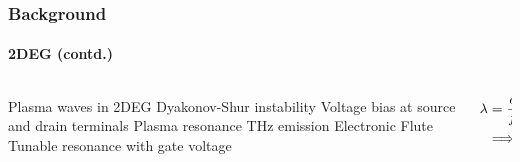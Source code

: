 \documentclass[mathserif,16pt,xcolor=table]{beamer}
\begin{document}
            \begin{frame}
              \frametitle{Background}
              \framesubtitle{2DEG (contd.)}

              \begin{columns} %
                \begin{column}{.5\textwidth}
                  \begin{minipage}[T][.1\textheight][c]{\linewidth}
                    \begin{outline}[itemize]
                      \1 Plasma waves in 2DEG
                      \1 Dyakonov-Shur instability
                        \2 Voltage bias at source and drain terminals
                        \2 Plasma resonance
                        \2 THz emission
                      \1 Electronic Flute
                        \2 Tunable resonance with gate voltage
                    \end{outline}
                  \end{minipage}
                \end{column}
                \begin{column}{.5\textwidth}
                  \begin{figure}
                    \hspace*{-.55cm}
                    \fontsize{6}{7}\selectfont
                    \def\svgwidth{1.1\linewidth}
                    
                  \end{figure}
                  \begin{equation} \nonumber
                    \begin{split}
                      \lambda &= \frac{c}{f} \\
                      & \Longrightarrow  300 \mu \mathrm{m}
                    \end{split}
                    \label{eq:disp_TE_two}
                  \end{equation}
                  \end{column}%
                \end{columns}
              \end{frame}
\end{document}
